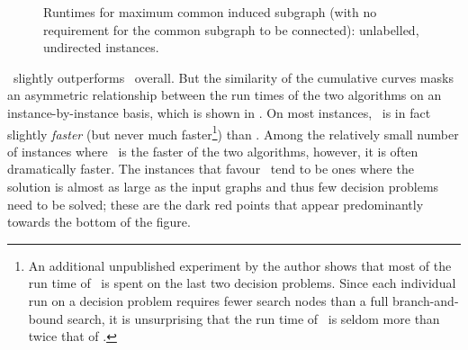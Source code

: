 \begin{figure}[htb!]
    \centering
    \par\bigskip
    \caption{Runtimes for maximum
    common induced subgraph (with no requirement for the common subgraph
    to be connected): unlabelled, undirected instances.}\label{figure:mcs-cumulative-plain-not-connected}
\end{figure}

\McSplitDown\ slightly outperforms \McSplit\ overall.
But the similarity of the cumulative curves masks an asymmetric relationship
between the run times of the two algorithms on an instance-by-instance basis, which is
shown in .  On most instances, \McSplit\ is in fact
slightly \emph{faster} (but never much faster\footnote{An additional unpublished
experiment by the author shows
that most of the run time of \McSplitDown\ is spent on the last two decision
problems. Since each individual run on a decision problem requires fewer search
nodes than a full branch-and-bound search, it is unsurprising that
the run time of \McSplitDown\ is seldom more than
twice that of \McSplit.}) than \McSplitDown.  Among the relatively
small number of instances where \McSplitDown\ is the faster of the two
algorithms, however, it is often dramatically faster.  The
instances that favour \McSplitDown\ tend to be ones where the solution is
almost as large as the input graphs and thus few decision problems need to be
solved; these are the dark red points that appear predominantly towards
the bottom of the figure.

